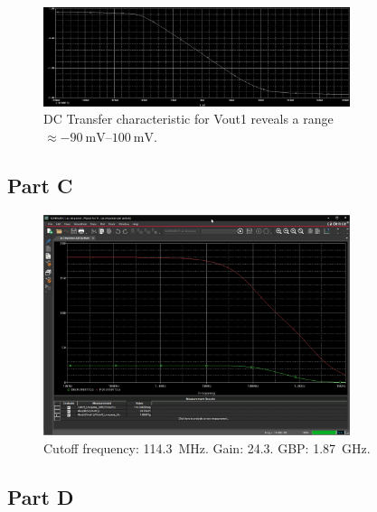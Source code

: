 \documentclass{article}
\newcommand \imgWidthFactor{0.8}
\begin{document}
		\begin{figure}[H]
			\centering
			\includegraphics[width=\imgWidthFactor\textwidth]{b2}
			\caption{DC Transfer characteristic for Vout1 reveals a range $\approx \SIrange{-90}{100}{\mV}$.}
		\end{figure}

	\subsection{Part C}

		\begin{figure}[H]
			\centering
			\includegraphics[width=\imgWidthFactor\textwidth]{c1}
			\caption{Cutoff frequency: \SI{114.3}{\MHz}. Gain: \SI{24.3}{}. GBP: \SI{1.87}{\GHz}.}
		\end{figure}

	\subsection{Part D}
\end{document}
